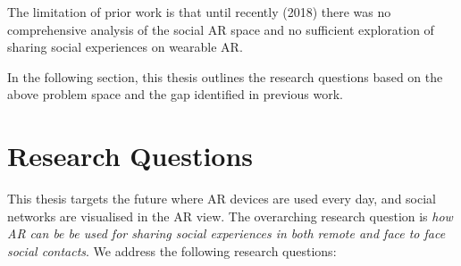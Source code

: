 The limitation of prior work is that until recently (2018) there was no comprehensive analysis of the social AR space and no sufficient exploration of sharing social experiences on wearable AR. 

In the following section, this thesis outlines the research questions based on the above problem space and the gap identified in previous work.

\section{Research Questions}

This thesis targets the future where AR devices are used every day, and social networks are visualised in the AR view. The overarching research question is \textit{how AR can be be used for sharing social experiences in both remote and face to face social contacts}. We address the following research questions: 


